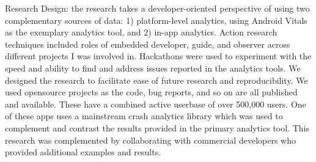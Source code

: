 \begin{SingleSpace}
Research Design: the research takes a developer-oriented perspective of using two complementary sources of data: 1) platform-level analytics, using Android Vitals as the exemplary analytics tool, and 2) in-app analytics.
%
%
Action research techniques included roles of embedded developer, guide, and observer across different projects I was involved in. Hackathons were used to experiment with the speed and ability to find and address issues reported in the analytics tools. 
%
We designed the research to facilitate ease of future research and reproducibility. We used opensource projects as the code, bug reports, and so on are all published and available. These have a combined active userbase of over 500,000 users. One of these apps uses a mainstream crash analytics library which was used to complement and contrast the results provided in the primary analytics tool.
This research was complemented by collaborating with commercial developers who provided additional examples and results. 



\end{SingleSpace}
